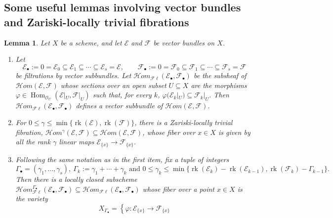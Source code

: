 \documentclass{amsart}
\theoremstyle{plain}
\newtheorem{lemma}[theorem]{Lemma}
\numberwithin{equation}{section}
\theoremstyle{definition}
\theoremstyle{remark}
\begin{document}
	\subsection{Some useful lemmas involving vector bundles and Zariski-locally trivial fibrations}
	\begin{lemma}\label{usefulLemmaInvolvingVBAndZariskiLTFibrations}
		Let $X$ be a scheme, and let $\mathcal E$ and $\mathcal F$ be vector bundles on $X$. 
		\begin{enumerate}
			\item Let
			$$
			\mathcal{E}_\bullet:=0=\mathcal E_0\subseteq \mathcal E_1\subseteq \cdots \subseteq \mathcal E_s=\mathcal E,
			\qquad
			\mathcal{F}_\bullet:=0=\mathcal F_0\subseteq \mathcal F_1\subseteq \cdots \subseteq \mathcal F_s=\mathcal F
			$$
			be filtrations by vector subbundles. Let
			$\mathcal H om_{\mathcal F\ell}(\mathcal E_\bullet,\mathcal F_\bullet)$ be the subsheaf of $\mathcal H om(\mathcal E,\mathcal F)$ whose sections over an open subset $U\subseteq X$ are the morphisms $\varphi\in \operatorname{Hom}_{\mathscr{O}_U}(\mathcal E|_U,\mathcal F|_U)$
			such that, for every $k$, $\varphi(\mathcal E_k|_U)\subseteq \mathcal F_k|_U$. Then
			$\mathcal H om_{\mathcal F\ell}(\mathcal E_\bullet,\mathcal F_\bullet)$ defines a vector subbundle of
			$\mathcal H om(\mathcal E,\mathcal F)$.
			\item For $0\leq \gamma \leq \min\{\operatorname{rk}(\mathcal{E}),\operatorname{rk}(\mathcal{F})\}$, there is a Zariski-locally trivial fibration, $\mathcal{H}om^\gamma(\mathcal{E},\mathcal{F})\subseteq\mathcal{H}om(\mathcal{E},\mathcal{F})$, whose fiber over $x\in X$ is given by all the rank $\gamma$ linear maps $\mathcal{E}_{\{x\}}\to \mathcal{F}_{\{x\}}$.  
			\item Following the same notation as in the first item,  fix a tuple of integers
			$$
			\Gamma_{\bullet}=(\gamma_{1},\ldots,\gamma_{s}), \  \Gamma_{k}:=\gamma_{1}+\cdots+\gamma_{k}\text{ and } 0\leq \gamma_{k}\leq \min\{\operatorname{rk}(\mathcal{E}_k)-\operatorname{rk}(\mathcal{E}_{k-1}),\operatorname{rk}(\mathcal{F}_k)-\Gamma_{k-1}\}.$$ 
			Then there is a locally closed subscheme $\mathcal{H}om_{\mathcal{F}\ell}^{\Gamma_\bullet}(\mathcal{E}_\bullet,\mathcal{F}_\bullet)\subseteq\mathcal{H}om_{\mathcal{F}\ell}(\mathcal{E}_\bullet,\mathcal{F}_\bullet)$
			whose fiber over a point \(x\in X\) is the variety
			\begin{equation}\label{varietyOfRankProfileFilteredMorphisms}
				X_{\Gamma_\bullet}=\left\{
				\varphi:\mathcal E_{\{x\}}\to \mathcal F_{\{x\}}

\end{equation}
\end{enumerate}
\end{lemma}
\end{document}
